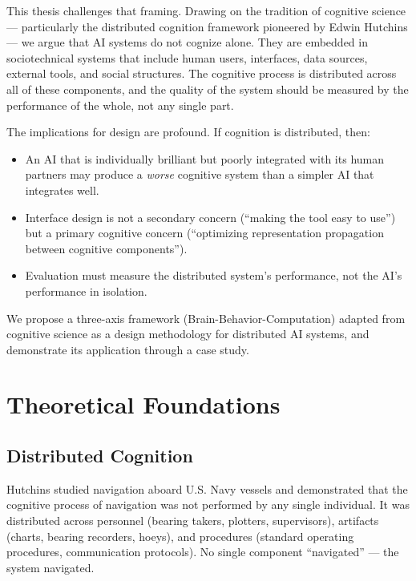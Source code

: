 \documentclass[11pt,a4paper]{article}
\begin{document}
This thesis challenges that framing. Drawing on the tradition of cognitive science --- particularly the distributed cognition framework pioneered by Edwin Hutchins \citep{hutchins1995} --- we argue that AI systems do not cognize alone. They are embedded in sociotechnical systems that include human users, interfaces, data sources, external tools, and social structures. The cognitive process is distributed across all of these components, and the quality of the system should be measured by the performance of the whole, not any single part.

The implications for design are profound. If cognition is distributed, then:
\begin{itemize}[leftmargin=*, itemsep=2pt]
  \item An AI that is individually brilliant but poorly integrated with its human partners may produce a \emph{worse} cognitive system than a simpler AI that integrates well.
  \item Interface design is not a secondary concern (``making the tool easy to use'') but a primary cognitive concern (``optimizing representation propagation between cognitive components'').
  \item Evaluation must measure the distributed system's performance, not the AI's performance in isolation.
\end{itemize}

We propose a three-axis framework (Brain-Behavior-Computation) adapted from cognitive science as a design methodology for distributed AI systems, and demonstrate its application through a case study.

\section{Theoretical Foundations}

\subsection{Distributed Cognition}

Hutchins \citep{hutchins1995} studied navigation aboard U.S. Navy vessels and demonstrated that the cognitive process of navigation was not performed by any single individual. It was distributed across personnel (bearing takers, plotters, supervisors), artifacts (charts, bearing recorders, hoeys), and procedures (standard operating procedures, communication protocols). No single component ``navigated'' --- the system navigated.
\end{document}

